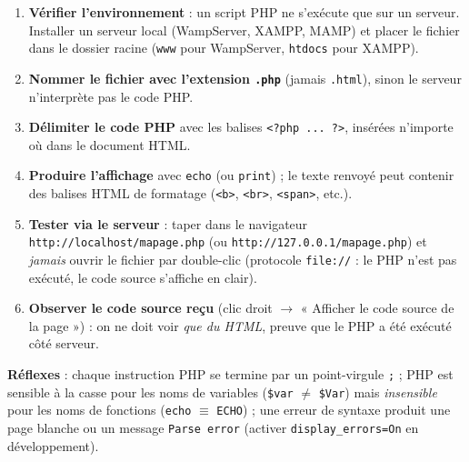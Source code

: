 \documentclass[11pt]{article}
\begin{document}
\begin{methode}
\begin{enumerate}
  \item \textbf{Vérifier l'environnement} : un script PHP ne s'exécute que sur un serveur. Installer un serveur local (WampServer, XAMPP, MAMP) et placer le fichier dans le dossier racine (\texttt{www} pour WampServer, \texttt{htdocs} pour XAMPP).
  \item \textbf{Nommer le fichier avec l'extension \texttt{.php}} (jamais \texttt{.html}), sinon le serveur n'interprète pas le code PHP.
  \item \textbf{Délimiter le code PHP} avec les balises \texttt{<?php ... ?>}, insérées n'importe où dans le document HTML.
  \item \textbf{Produire l'affichage} avec \texttt{echo} (ou \texttt{print}) ; le texte renvoyé peut contenir des balises HTML de formatage (\texttt{<b>}, \texttt{<br>}, \texttt{<span>}, etc.).
  \item \textbf{Tester via le serveur} : taper dans le navigateur \texttt{http://localhost/mapage.php} (ou \texttt{http://127.0.0.1/mapage.php}) et \emph{jamais} ouvrir le fichier par double-clic (protocole \texttt{file://} : le PHP n'est pas exécuté, le code source s'affiche en clair).
  \item \textbf{Observer le code source reçu} (clic droit $\rightarrow$ « Afficher le code source de la page ») : on ne doit voir \emph{que du HTML}, preuve que le PHP a été exécuté côté serveur.
\end{enumerate}
\textbf{Réflexes} : chaque instruction PHP se termine par un point-virgule \texttt{;} ; PHP est sensible à la casse pour les noms de variables (\texttt{\$var} $\neq$ \texttt{\$Var}) mais \emph{insensible} pour les noms de fonctions (\texttt{echo} $\equiv$ \texttt{ECHO}) ; une erreur de syntaxe produit une page blanche ou un message \texttt{Parse error} (activer \texttt{display\_errors=On} en développement).
\end{methode}
\end{document}
